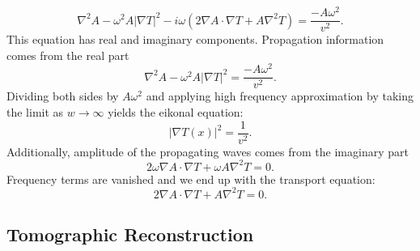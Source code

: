 \begin{equation}
    \label{eqn:plugging}
    \nabla^2 A - \omega^2 A |\nabla T|^2 - i \omega (2 \nabla A \cdot \nabla T + A \nabla^2 T) = \frac{-A \omega^2}{v^2}.
\end{equation}
This equation has real and imaginary components. Propagation information comes from the real part
\begin{equation}
    \label{eqn:real_part}
    \nabla^2 A - \omega^2 A |\nabla T|^2 = \frac{-A \omega^2}{v^2}.
\end{equation}
Dividing both sides by $A \omega^2$ and applying high frequency approximation by taking the limit as $w \to \infty$ yields the eikonal equation:
\begin{equation}
    \label{eqn:eikonal}
    |\nabla T(x)|^2 = \frac{1}{v^2}.
\end{equation}
Additionally, amplitude of the propagating waves comes from the imaginary part
\begin{equation}
    \label{eqn:imaginary}
    2 \omega \nabla A \cdot \nabla T + \omega A \nabla^2 T=0.
\end{equation}
Frequency terms are vanished and we end up with the transport equation:
\begin{equation}
    \label{eqn:transport_eq}
    2 \nabla A \cdot \nabla T + A \nabla^2 T=0.
\end{equation}

\subsection{Tomographic Reconstruction}

